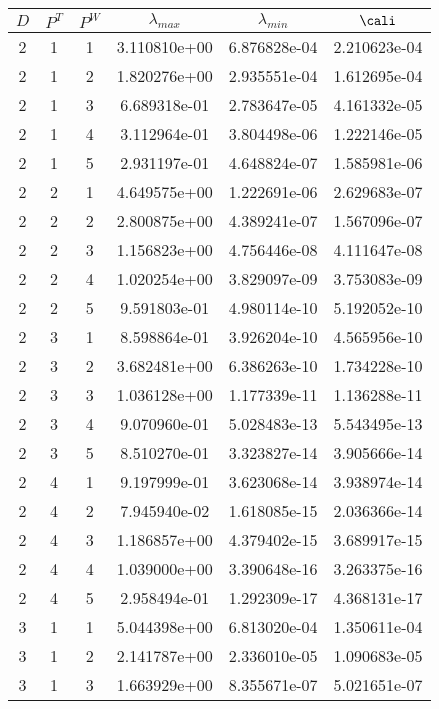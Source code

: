 \documentclass{article}
\begin{document}
{\begin{small}
\begin{table}
\begin{center}
  \begin{tabular}{|ccc|ccc|} \hline
 $D$ & $P^T$  & $P^W$  & $\lambda_{max}$ & $\lambda_{min}$   & $\cali$ \\
  \hline
2 & 1 & 1 &  3.110810e+00 & 6.876828e-04 & 2.210623e-04 \\ 
2 & 1 & 2 &  1.820276e+00 & 2.935551e-04 & 1.612695e-04 \\ 
2 & 1 & 3 &  6.689318e-01 & 2.783647e-05 & 4.161332e-05 \\ 
2 & 1 & 4 &  3.112964e-01 & 3.804498e-06 & 1.222146e-05 \\ 
2 & 1 & 5 &  2.931197e-01 & 4.648824e-07 & 1.585981e-06 \\ 
2 & 2 & 1 &  4.649575e+00 & 1.222691e-06 & 2.629683e-07 \\ 
2 & 2 & 2 &  2.800875e+00 & 4.389241e-07 & 1.567096e-07 \\ 
2 & 2 & 3 &  1.156823e+00 & 4.756446e-08 & 4.111647e-08 \\ 
2 & 2 & 4 &  1.020254e+00 & 3.829097e-09 & 3.753083e-09 \\   
2 & 2 & 5 &  9.591803e-01 & 4.980114e-10 & 5.192052e-10 \\ 
2 & 3 & 1 &  8.598864e-01 & 3.926204e-10 & 4.565956e-10 \\ 
2 & 3 & 2 &  3.682481e+00 & 6.386263e-10 & 1.734228e-10 \\ 
2 & 3 & 3 &  1.036128e+00 & 1.177339e-11 & 1.136288e-11 \\ 
2 & 3 & 4 &  9.070960e-01 & 5.028483e-13 & 5.543495e-13 \\ 
2 & 3 & 5 &  8.510270e-01 & 3.323827e-14 & 3.905666e-14 \\ 
2 & 4 & 1 &  9.197999e-01 & 3.623068e-14 & 3.938974e-14 \\ 
2 & 4 & 2 &  7.945940e-02 & 1.618085e-15 & 2.036366e-14 \\ 
2 & 4 & 3 &  1.186857e+00 & 4.379402e-15 & 3.689917e-15 \\ 
2 & 4 & 4 &  1.039000e+00 & 3.390648e-16 & 3.263375e-16 \\ 
2 & 4 & 5 &  2.958494e-01 & 1.292309e-17 & 4.368131e-17 \\
\hline
3 & 1 & 1 &  5.044398e+00 & 6.813020e-04 & 1.350611e-04 \\
3 & 1 & 2 &  2.141787e+00 & 2.336010e-05 & 1.090683e-05 \\
3 & 1 & 3 &  1.663929e+00 & 8.355671e-07 & 5.021651e-07 \\

\end{tabular}
\end{center}
\end{table}
\end{small}}
\end{document}
